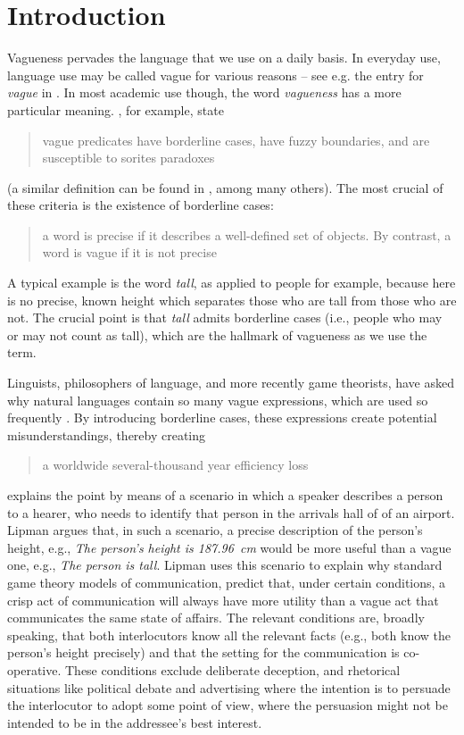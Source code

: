 \section{Introduction}
\label{sec:1}

Vagueness pervades the language that we use on a daily basis. In everyday use, language use may be called vague for various reasons -- see e.g. the entry for \emph{vague} in \cite{penguin}.  In most academic use though, the word \emph{vagueness} has a more particular meaning. \citeauthor{keefe1997vagueness}, for example, state \begin{quotation}vague predicates have borderline cases, have fuzzy boundaries, and are susceptible to sorites paradoxes \cite[p.\ 4]{keefe1997vagueness}\end{quotation} (a similar definition can be found in \cite{EgreKlinedinst}, among many others).  The most crucial of these criteria is the existence of borderline cases: \begin{quotation}a word is precise if it describes a well-defined set of objects. By contrast, a word is vague if it is not precise \cite[p.\ 1]{lipmanvague}\end{quotation} A typical example is the word \emph{tall}, as applied to people for example, because here is no precise, known height which separates those who are tall from those who are not. The crucial point is that \emph{tall} admits borderline cases (i.e., people who may or may not count as tall), which are the hallmark of vagueness as we use the term.

Linguists, philosophers of language, and more recently game theorists, have asked why natural languages contain so many vague expressions, which are used so frequently \cite{Lipman:2000fk, lipmanvague}. By introducing borderline cases, these expressions create potential misunderstandings, thereby creating \begin{quotation}a worldwide several-thousand year efficiency loss \cite[p.\ 1]{lipmanvague}\end{quotation} \citeauthor{lipmanvague} explains the point by means of a scenario in which a speaker describes a person to a hearer, who needs to identify that person in the arrivals hall of of an airport. Lipman argues that, in such a scenario, a precise description of the person's height, e.g., \textsl{The person's height is 187.96~cm} would be more useful than a vague one, e.g., \textsl{The person is tall}. Lipman uses this scenario to explain why standard game theory models of communication, \citep[e.g.][]{Crawford:1982lr} predict that, under certain conditions, a crisp act of communication will always have more utility than a vague act that communicates the same state of affairs. The relevant conditions are, broadly speaking, that both interlocutors know all the relevant facts (e.g., both know the person's height precisely) and that the setting for the communication is co-operative. These conditions exclude deliberate deception, and rhetorical situations like political debate and advertising where the intention is to persuade the interlocutor to adopt some point of view, where the persuasion might not be intended to be in the addressee's best interest. 

